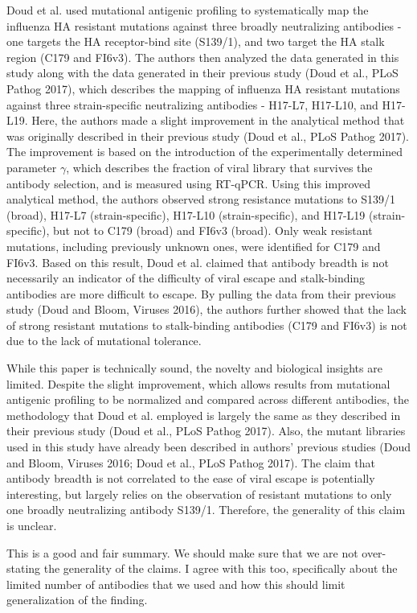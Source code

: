 \documentclass[11pt, oneside]{article}   	%
\begin{document}
Doud et al. used mutational antigenic profiling to systematically map the influenza HA resistant mutations against three broadly neutralizing antibodies - one targets the HA receptor-bind site (S139/1), and two target the HA stalk region (C179 and FI6v3). The authors then analyzed the data generated in this study along with the data generated in their previous study (Doud et al., PLoS Pathog 2017), which describes the mapping of influenza HA resistant mutations against three strain-specific neutralizing antibodies - H17-L7, H17-L10, and H17-L19. Here, the authors made a slight improvement in the analytical method that was originally described in their previous study (Doud et al., PLoS Pathog 2017). The improvement is based on the introduction of the experimentally determined parameter $\gamma$, which describes the fraction of viral library that survives the antibody selection, and is measured using RT-qPCR. Using this improved analytical method, the authors observed strong resistance mutations to S139/1 (broad), H17-L7 (strain-specific), H17-L10 (strain-specific), and H17-L19 (strain-specific), but not to C179 (broad) and FI6v3 (broad). Only weak resistant mutations, including previously unknown ones, were identified for C179 and FI6v3. Based on this result, Doud et al. claimed that antibody breadth is not necessarily an indicator of the difficulty of viral escape and stalk-binding antibodies are more difficult to escape. By pulling the data from their previous study (Doud and Bloom, Viruses 2016), the authors further showed that the lack of strong resistant mutations to stalk-binding antibodies (C179 and FI6v3) is not due to the lack of mutational tolerance.

While this paper is technically sound, the novelty and biological insights are limited. Despite the slight improvement, which allows results from mutational antigenic profiling to be normalized and compared across different antibodies, the methodology that Doud et al. employed is largely the same as they described in their previous study (Doud et al., PLoS Pathog 2017). Also, the mutant libraries used in this study have already been described in authors' previous studies (Doud and Bloom, Viruses 2016; Doud et al., PLoS Pathog 2017). The claim that antibody breadth is not correlated to the ease of viral escape is potentially interesting, but largely relies on the observation of resistant mutations to only one broadly neutralizing antibody S139/1. Therefore, the generality of this claim is unclear.

{\color{red} This is a good and fair summary.
We should make sure that we are not over-stating the generality of the claims.}
{\color{blue} I agree with this too, specifically about the limited number of antibodies that we used and how this should limit generalization of the finding.}
\end{document}
